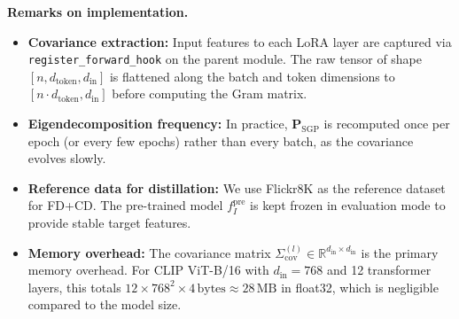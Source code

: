 \documentclass{article}
\begin{document}
\vspace{0.5em}
\noindent\textbf{Remarks on implementation.}
\begin{itemize}
    \item \textbf{Covariance extraction:} Input features to each LoRA layer are captured via \texttt{register\_forward\_hook} on the parent module. The raw tensor of shape $[n, d_{\text{token}}, d_{\text{in}}]$ is flattened along the batch and token dimensions to $[n \cdot d_{\text{token}}, d_{\text{in}}]$ before computing the Gram matrix.
    \item \textbf{Eigendecomposition frequency:} In practice, $\mathbf{P}_{\text{SGP}}$ is recomputed once per epoch (or every few epochs) rather than every batch, as the covariance evolves slowly.
    \item \textbf{Reference data for distillation:} We use Flickr8K as the reference dataset for FD+CD. The pre-trained model $f_I^{\text{pre}}$ is kept frozen in evaluation mode to provide stable target features.
    \item \textbf{Memory overhead:} The covariance matrix $\Sigma_{\text{cov}}^{(l)} \in \mathbb{R}^{d_{\text{in}} \times d_{\text{in}}}$ is the primary memory overhead. For CLIP ViT-B/16 with $d_{\text{in}} = 768$ and 12 transformer layers, this totals $12 \times 768^2 \times 4\,\text{bytes} \approx 28\,\text{MB}$ in float32, which is negligible compared to the model size.
\end{itemize}

\fi
\end{document}
